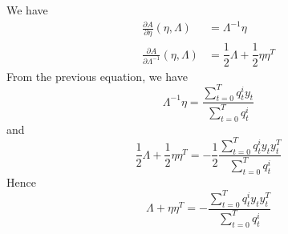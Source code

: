 \documentclass[a4paper, 11pt]{article}
\newcommand{\pd}[2]{\frac{\partial #1}{\partial #2}}
\newcommand{\ssemi}{\hspace{.3em};\hspace{.3em}}
\begin{document}
We have
\begin{align*}
  \pd{A}{\eta}(\eta, \Lambda) & = \Lambda^{-1} \eta \\
  \pd{A}{\Lambda^{-1}}(\eta, \Lambda) & = \dfrac{1}{2} \Lambda + \dfrac{1}{2} \eta \eta^T
\end{align*}
From the previous equation, we have
\begin{displaymath}
  \Lambda^{-1} \eta = \dfrac{
    \sum_{t = 0}^T q_t^i y_t
  }{
    \sum_{t = 0}^T q_t^i
  }
\end{displaymath}
and
\begin{displaymath}
  \dfrac{1}{2} \Lambda + \dfrac{1}{2} \eta \eta^T  = -\dfrac{1}{2} \dfrac{
    \sum_{t = 0}^T q_t^i y_t y_t^T
  }{
    \sum_{t = 0}^T q_t^i
  }
\end{displaymath}
Hence
\begin{displaymath}
  \Lambda + \eta \eta^T  = - \dfrac{
    \sum_{t = 0}^T q_t^i y_t y_t^T
  }{
    \sum_{t = 0}^T q_t^i
  }
\end{displaymath}














\end{document}

